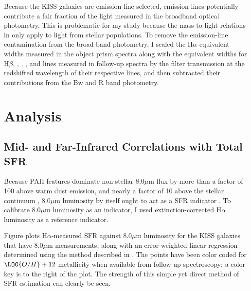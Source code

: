 Because the KISS galaxies are emission-line selected, emission lines potentially contribute a fair fraction of the light measured in the broadband optical photometry. This is problematic for my study because the mass-to-light relations in \cite{Bell} only apply to light from stellar populations. To remove the emission-line contamination from the broad-band photometry, I scaled the H$\alpha$ equivalent widths measured in the object prism spectra along with the equivalent widths for H$\beta$, , , , and  lines measured in follow-up spectra \citep{KISSIV,KISSG} by the filter transmission at the redshifted wavelength of their respective lines, and then subtracted their contributions from the Bw and R band photometry.



\section{Analysis}
\label{sec:kissanalysis}

\subsection{Mid- and Far-Infrared Correlations with Total SFR}
\label{direct}



Because PAH features dominate non-stellar 8.0$\mu$m flux by more than a factor of 100 above warm dust emission, and nearly a factor of 10 above the stellar continuum \citep[][see their Figures 8 and 10]{Dale,LiDraine}, 8.0$\mu$m luminosity by itself ought to act as a SFR indicator \citep[e.g.,][]{Calzetti2007}. To calibrate 8.0$\mu$m luminosity as an indicator, I used extinction-corrected H$\alpha$ luminosity as a reference indicator. 

Figure  plots H$\alpha$-measured SFR against 8.0$\mu$m luminosity for the KISS galaxies that have 8.0$\mu$m measurements, along with an error-weighted linear regression determined using the method described in \cite{AkritasBershady}. The points have been color coded for $\LOG{O/H}+12$ metallicity when available from follow-up spectroscopy; a color key is to the right of the plot. The strength of this simple yet direct method of SFR estimation can clearly be seen. 

